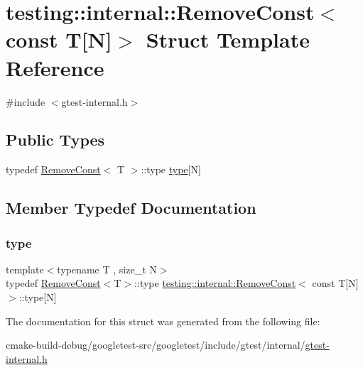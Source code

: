 \hypertarget{structtesting_1_1internal_1_1RemoveConst_3_01const_01T[N]_4}{}\section{testing\+::internal\+::Remove\+Const$<$ const T\mbox{[}N\mbox{]}$>$ Struct Template Reference}
\label{structtesting_1_1internal_1_1RemoveConst_3_01const_01T[N]_4}


{\ttfamily \#include $<$gtest-\/internal.\+h$>$}

\subsection*{Public Types}
\begin{DoxyCompactItemize}
\item 
typedef \mbox{\hyperlink{structtesting_1_1internal_1_1RemoveConst}{Remove\+Const}}$<$ T $>$\+::type \mbox{\hyperlink{structtesting_1_1internal_1_1RemoveConst_3_01const_01T[N]_4_ac976b53cb5d031a120fafbe790650068}{type}}\mbox{[}N\mbox{]}
\end{DoxyCompactItemize}


\subsection{Member Typedef Documentation}
\mbox{\label{structtesting_1_1internal_1_1RemoveConst_3_01const_01T[N]_4_ac976b53cb5d031a120fafbe790650068}} 
\subsubsection{\texorpdfstring{type}{type}}
{\footnotesize\ttfamily template$<$typename T , size\+\_\+t N$>$ \\
typedef \mbox{\hyperlink{structtesting_1_1internal_1_1RemoveConst}{Remove\+Const}}$<$T$>$\+::type \mbox{\hyperlink{structtesting_1_1internal_1_1RemoveConst}{testing\+::internal\+::\+Remove\+Const}}$<$ const T\mbox{[}N\mbox{]}$>$\+::type\mbox{[}N\mbox{]}}



The documentation for this struct was generated from the following file\+:\begin{DoxyCompactItemize}
\item 
cmake-\/build-\/debug/googletest-\/src/googletest/include/gtest/internal/\mbox{\hyperlink{gtest-internal_8h}{gtest-\/internal.\+h}}\end{DoxyCompactItemize}
